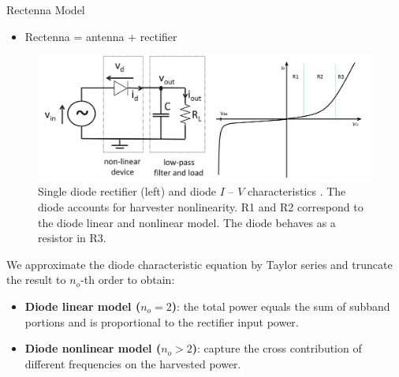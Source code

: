 \documentclass[xcolor={table}]{beamer}
\begin{document}
\begin{frame}[fragile=singleslide,t]
\begin{columns}[onlytextwidth,T]
\begin{column}{.47\textwidth}
\begin{block}{Rectenna Model}
\begin{itemize}
  \item Rectenna = antenna + rectifier
\end{itemize}
\begin{figure}
  \centering
    \includegraphics[width=\textwidth]{rectenna_model}
  \caption{Single diode rectifier (left) and diode $I$ -- $V$ characteristics \citep{Clerckx2019}. The diode accounts for harvester nonlinearity. R1 and R2 correspond to the diode linear and nonlinear model. The diode behaves as a resistor in R3.}
  \label{fig:rectenna_model}
\end{figure}
We approximate the diode characteristic equation by Taylor series and truncate the result to ${n_o}$-th order to obtain:
  \begin{itemize}
    \item \textbf{Diode linear model (${n_o} = 2$)}: the total power equals the sum of subband portions and is proportional to the rectifier input power. %
    \item \textbf{Diode nonlinear model (${n_o} > 2$)}: capture the cross contribution of different frequencies on the harvested power. %
  \end{itemize}
\end{block}



\end{column}
\end{columns}
\end{frame}
\end{document}
